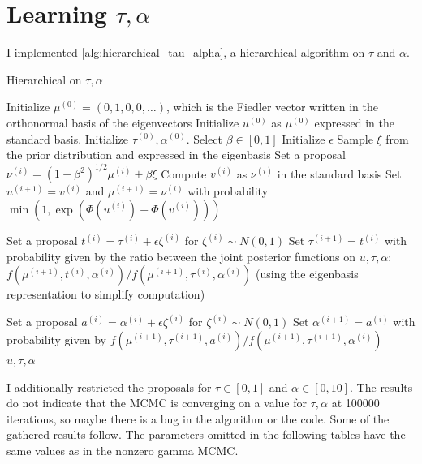 \documentclass{siamart1116}
\begin{document}
\section{Learning $\tau, \alpha$}
I implemented \cref{alg:hierarchical_tau_alpha}, a hierarchical algorithm on $\tau$ and $\alpha$.
\begin{algorithm}
\caption{Hierarchical on $\tau, \alpha$}
\label{alg:hierarchical_tau_alpha}
\begin{algorithmic}
\State Initialize $\mu^{(0)} = (0, 1, 0, 0, \ldots)$, which is the Fiedler vector written in the orthonormal basis of the eigenvectors
\State Initialize $u^{(0)}$ as $\mu^{(0)}$ expressed in the standard basis.
\State Initialize $\tau^{(0)}, \alpha^{(0)}$. Select $\beta \in [0, 1]$
\State Initialize $\epsilon$
\State Sample $\xi$ from the prior distribution and expressed in the eigenbasis 
\State Set a proposal $\nu^{(i)} = (1- \beta^2)^{1/2}\mu^{(i)} + \beta \xi$
\State Compute $v^{(i)}$ as $\nu^{(i)}$ in the standard basis
\State Set $u^{(i+1)} = v^{(i)}$ and $\mu^{(i+1)} = \nu^{(i)}$ with probability $\min (1, \exp(\Phi(u^{(i)}) - \Phi(v^{(i)})) )$

\State Set a proposal $t^{(i)} = \tau^{(i)} + \epsilon \zeta^{(i)}$ for $\zeta^{(i)} \sim N(0, 1)$ 
\State Set $\tau^{(i+1)} = t^{(i)}$ with probability given by the ratio between the joint posterior functions on $u, \tau, \alpha$: $f(\mu^{(i+1)}, t^{(i)}, \alpha^{(i)})/f(\mu^{(i+1)}, \tau^{(i)}, \alpha^{(i)})$ (using the eigenbasis representation to simplify computation)

\State Set a proposal $a^{(i)} = \alpha^{(i)} + \epsilon \zeta^{(i)}$ for $\zeta^{(i)} \sim N(0, 1)$ 
\State Set $\alpha^{(i+1)} = a^{(i)}$ with probability given by $f(\mu^{(i+1)}, \tau^{(i+1)}, a^{(i)})/f(\mu^{(i+1)}, \tau^{(i+1)}, \alpha^{(i)})$
\EndFor\\
\Return $u, \tau, \alpha$
\end{algorithmic}
\end{algorithm}

I additionally restricted the proposals for $\tau \in [0, 1]$ and $\alpha \in [0, 10]$. The results do not indicate that the MCMC is converging on a value for $\tau, \alpha$ at 100000 iterations, so maybe there is a bug in the algorithm or the code. Some of the gathered results follow. The parameters omitted in the following tables have the same values as in the nonzero gamma MCMC.
\end{document}
